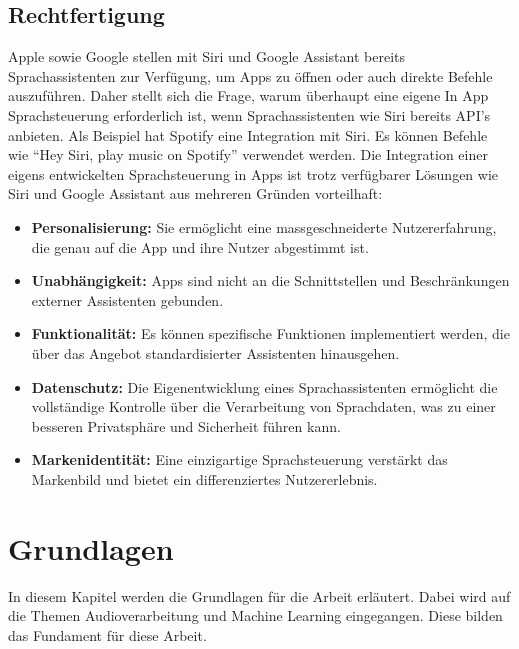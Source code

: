 \documentclass[11pt,a4paper]{article}
\begin{document}
\subsection{Rechtfertigung}
Apple sowie Google stellen mit Siri und Google Assistant bereits Sprachassistenten zur 
Verfügung, um Apps zu öffnen oder auch direkte Befehle auszuführen. Daher stellt sich die Frage, 
warum überhaupt eine eigene In App Sprachsteuerung erforderlich ist, wenn Sprachassistenten wie Siri 
bereits API's anbieten. Als Beispiel hat Spotify eine Integration mit Siri. Es können Befehle wie 
``Hey Siri, play music on Spotify'' verwendet werden. Die Integration einer eigens entwickelten 
Sprachsteuerung in Apps ist trotz verfügbarer Lösungen wie Siri und Google Assistant aus mehreren 
Gründen vorteilhaft:


\begin{itemize}[itemsep=0pt, parsep=0pt]
    \item \textbf{Personalisierung:} Sie ermöglicht eine massgeschneiderte Nutzererfahrung, die genau 
	auf die App und ihre Nutzer abgestimmt ist.
    \item \textbf{Unabhängigkeit:} Apps sind nicht an die Schnittstellen und Beschränkungen externer 
	Assistenten gebunden.
    \item \textbf{Funktionalität:} Es können spezifische Funktionen implementiert werden, die über 
	das Angebot standardisierter Assistenten hinausgehen.
    \item \textbf{Datenschutz:} Die Eigenentwicklung eines Sprachassistenten ermöglicht die vollständige Kontrolle über die Verarbeitung 
	von Sprachdaten, was zu einer besseren Privatsphäre und Sicherheit führen kann. 
    \item \textbf{Markenidentität:} Eine einzigartige Sprachsteuerung verstärkt das Markenbild und 
	bietet ein differenziertes Nutzererlebnis.
\end{itemize}

\noindent 

\newpage \section{Grundlagen}\label{sec:grundlagen}
In diesem Kapitel werden die Grundlagen für die Arbeit erläutert. Dabei wird auf die Themen
Audioverarbeitung und Machine Learning eingegangen. Diese bilden das Fundament für diese Arbeit.
\end{document}
